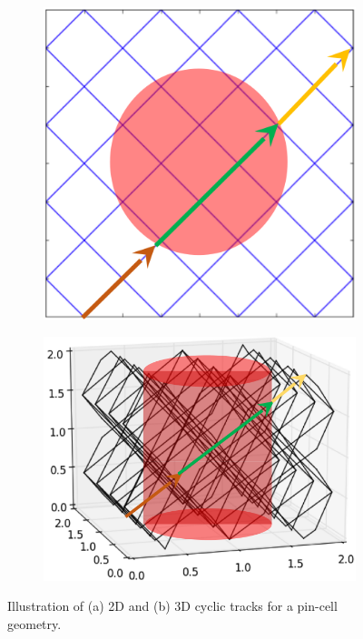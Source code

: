 \documentclass[12pt,twoside]{mitthesis-exec}
\begin{document}
\begin{figure}[h!]
	\centering
	\begin{subfigure}[b]{0.25\textwidth}
		\centering
		\includegraphics[width=\linewidth]{figures/laydown/kord_tracks_2D.png}
		\caption{}
		\label{fig:sample-tracks-a}
	\end{subfigure}
	\begin{subfigure}[b]{0.35\textwidth}
		\centering
		\includegraphics[width=\linewidth]{figures/laydown/kord_tracks_3D.png}
		\caption{}
		\label{fig:sample-tracks-b}
	\end{subfigure}
	\caption[]{Illustration of (a) 2D and (b) 3D cyclic tracks for a pin-cell geometry.}
	\label{fig:sample-tracks}
\end{figure}
\end{document}
